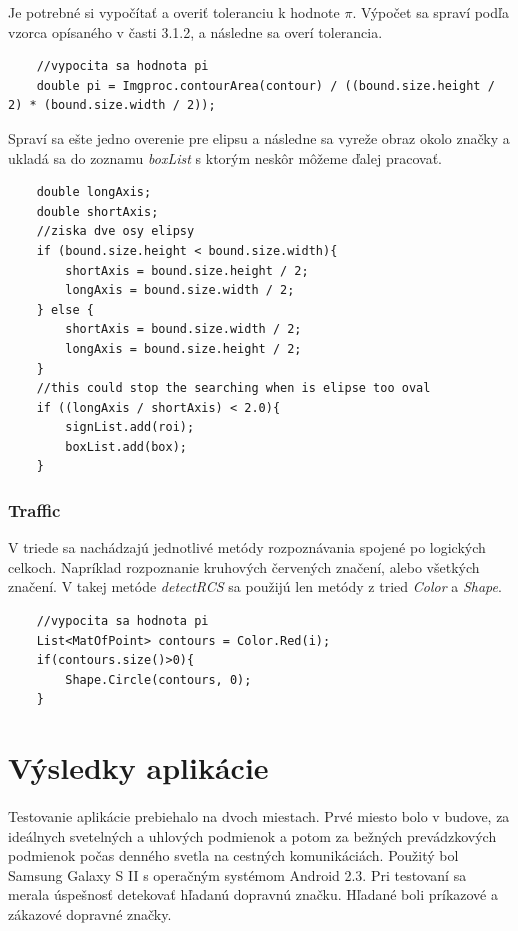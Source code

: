 \documentclass[12pt]{article}
\begin{document}
Je potrebné si vypočítať a overiť toleranciu k hodnote $\pi$. Výpočet sa spraví podľa vzorca opísaného v časti 3.1.2, a následne sa overí tolerancia.
\begin{lstlisting}
	//vypocita sa hodnota pi
	double pi = Imgproc.contourArea(contour) / ((bound.size.height / 2) * (bound.size.width / 2));
\end{lstlisting}
Spraví sa ešte jedno overenie pre elipsu a následne sa vyreže obraz okolo značky a ukladá sa do zoznamu \emph{boxList} s ktorým neskôr môžeme ďalej pracovať.
\begin{lstlisting}
	double longAxis;
	double shortAxis;
	//ziska dve osy elipsy
	if (bound.size.height < bound.size.width){
		shortAxis = bound.size.height / 2;
		longAxis = bound.size.width / 2;
	} else {
		shortAxis = bound.size.width / 2;
		longAxis = bound.size.height / 2;
	}
	//this could stop the searching when is elipse too oval 
	if ((longAxis / shortAxis) < 2.0){
		signList.add(roi);
		boxList.add(box);
	}
\end{lstlisting}
\subsubsection{Traffic}
V triede sa nachádzajú jednotlivé metódy rozpoznávania spojené po logických celkoch. Napríklad rozpoznanie kruhových červených značení, alebo všetkých značení.
V takej metóde \emph{detectRCS} sa použijú len metódy z tried \emph{Color} a \emph{Shape}.
\begin{lstlisting}
	//vypocita sa hodnota pi
	List<MatOfPoint> contours = Color.Red(i);
	if(contours.size()>0){
		Shape.Circle(contours, 0);
	}
\end{lstlisting}
\section{Výsledky aplikácie}
\paragraph{}
Testovanie aplikácie prebiehalo na dvoch miestach. Prvé miesto bolo v budove, za ideálnych svetelných a uhlových podmienok a potom za bežných prevádzkových podmienok počas denného svetla na cestných komunikáciách. Použitý bol Samsung Galaxy S II s operačným systémom Android 2.3. Pri testovaní sa merala úspešnosť detekovať hľadanú dopravnú značku. Hľadané boli príkazové a zákazové dopravné značky.
\end{document}
